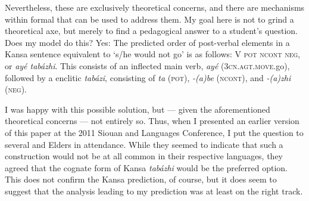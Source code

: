 \documentclass[output=paper]{LSP/langsci}
\begin{document}
Nevertheless, these are exclusively theoretical concerns, and there are mechanisms within formal  that can be used to address them. My goal here is not to grind a theoretical axe, but merely to find a pedagogical answer to a student's question. Does my model do this? Yes: The predicted order of post-verbal elements in a Kansa sentence equivalent to  `s/he would not go' is as follows: V \textsc{pot ncont} \textsc{neg}, or \textit{ay\'e tabázhi}. This consists of an inflected main verb, \textit{ay\'e} (\textsc{3cn.agt.move}.go), followed by a  enclitic \textit{tabázi}, consisting of \textit{ta} (\textsc{pot}), \textit{-(a)be} (\textsc{ncont}), and \textit{-(a)zhi} (\textsc{neg}).
	
I was happy with this possible solution, but --- given the aforementioned theoretical concerns --- not entirely so. Thus, when I presented an earlier version of this paper at the 2011 Siouan and  Languages Conference, I put the question to several  and  Elders in attendance. While they seemed to indicate that such a construction would not be at all common in their respective languages, they agreed that the cognate form of Kansa \textit{tabázhi} would be the preferred option. This does not confirm the Kansa prediction, of course, but it does seem to suggest that the analysis leading to my prediction was at least on the right track.
\end{document}
